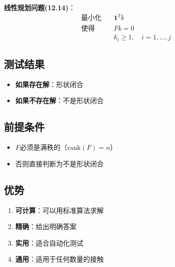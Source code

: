 \documentclass[12pt,a4paper]{article}
\begin{document}
\textbf{线性规划问题(12.14)}：
\begin{align}
\text{最小化} \quad & \mathbf{1}^T k \\
\text{使得} \quad & F k = 0 \\
& k_i \geq 1, \quad i = 1, \ldots, j
\end{align}

\subsection{测试结果}

\begin{itemize}
\item \textbf{如果存在解}：形状闭合
\item \textbf{如果不存在解}：不是形状闭合
\end{itemize}

\subsection{前提条件}

\begin{itemize}
\item $F$必须是满秩的（$\text{rank}(F) = n$）
\item 否则直接判断为不是形状闭合
\end{itemize}

\subsection{优势}

\begin{enumerate}
\item \textbf{可计算}：可以用标准算法求解
\item \textbf{精确}：给出明确答案
\item \textbf{实用}：适合自动化测试
\item \textbf{通用}：适用于任何数量的接触
\end{enumerate}
\end{document}
